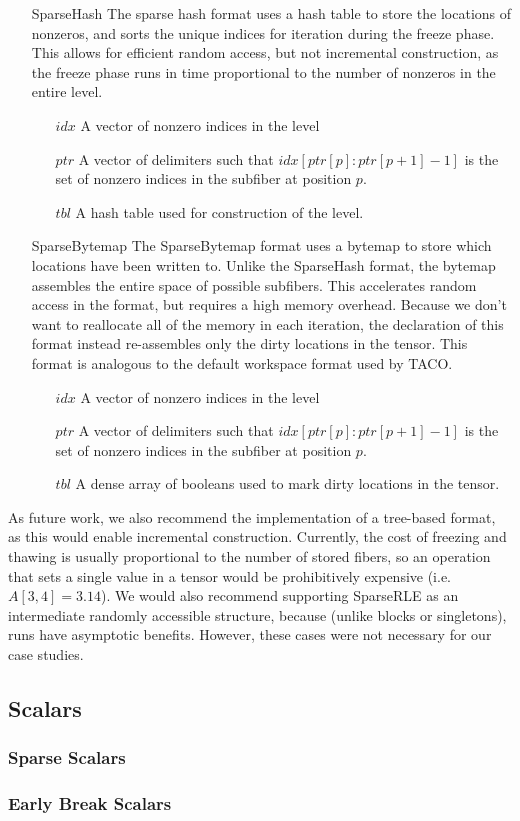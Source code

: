 \begin{enumerate}
\item[SparseHash]
    The sparse hash format uses a hash table to store the locations of nonzeros,
    and sorts the unique indices for iteration during the freeze phase. This
    allows for efficient random access, but not incremental construction, as the
    freeze phase runs in time proportional to the number of nonzeros in the
    entire level.
    \begin{enumerate}
        \item[$idx$] A vector of nonzero indices in the level
        \item[$ptr$] A vector of delimiters such that $idx[ptr[p]:ptr[p+1] - 1]$ is the set of nonzero indices in the subfiber at position $p$.
        \item[$tbl$] A hash table used for construction of the level.
    \end{enumerate}
\item[SparseBytemap]
    The SparseBytemap format uses a bytemap to store which locations have been
    written to. Unlike the SparseHash format, the bytemap assembles the entire
    space of possible subfibers. This accelerates random access in the format,
    but requires a high memory overhead. Because we don't want to reallocate all
    of the memory in each iteration, the declaration of this format instead
    re-assembles only the dirty locations in the tensor. This format is
    analogous to the default workspace format used by TACO.
    \begin{enumerate}
        \item[$idx$] A vector of nonzero indices in the level
        \item[$ptr$] A vector of delimiters such that $idx[ptr[p]:ptr[p+1] - 1]$ is the set of nonzero indices in the subfiber at position $p$.
        \item[$tbl$] A dense array of booleans used to mark dirty locations in the tensor.
    \end{enumerate}
\end{enumerate}

As future work, we also recommend the implementation of a tree-based format, as
this would enable incremental construction. Currently, the cost of freezing and
thawing is usually proportional to the number of stored fibers, so an operation
that sets a single value in a tensor would be prohibitively expensive (i.e.
$A[3, 4] = 3.14$). We would also recommend supporting SparseRLE as an
intermediate randomly accessible structure, because (unlike blocks or
singletons), runs have asymptotic benefits. However, these cases were not
necessary for our case studies.

\subsection{Scalars}

\subsubsection{Sparse Scalars}
\subsubsection{Early Break Scalars}